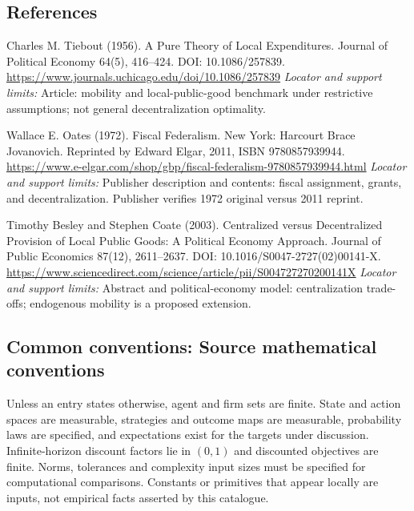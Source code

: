 \documentclass[11pt,a4paper]{article}
\begin{document}
\subsection*{References}
\begin{enumerate}[label={[S\arabic*]},leftmargin=*,itemsep=0.6em]
\item Charles M. Tiebout (1956). A Pure Theory of Local Expenditures. Journal of Political Economy 64(5), 416--424. DOI: 10.1086/257839.
\url{https://www.journals.uchicago.edu/doi/10.1086/257839}
\newline\emph{Locator and support limits:} Article: mobility and local-public-good benchmark under restrictive assumptions; not general decentralization optimality.
\item Wallace E. Oates (1972). Fiscal Federalism. New York: Harcourt Brace Jovanovich. Reprinted by Edward Elgar, 2011, ISBN 9780857939944.
\url{https://www.e-elgar.com/shop/gbp/fiscal-federalism-9780857939944.html}
\newline\emph{Locator and support limits:} Publisher description and contents: fiscal assignment, grants, and decentralization. Publisher verifies 1972 original versus 2011 reprint.
\item Timothy Besley and Stephen Coate (2003). Centralized versus Decentralized Provision of Local Public Goods: A Political Economy Approach. Journal of Public Economics 87(12), 2611--2637. DOI: 10.1016/S0047-2727(02)00141-X.
\url{https://www.sciencedirect.com/science/article/pii/S004727270200141X}
\newline\emph{Locator and support limits:} Abstract and political-economy model: centralization trade-offs; endogenous mobility is a proposed extension.
\end{enumerate}

\subsection*{Common conventions: Source mathematical conventions}

Unless an entry states otherwise, agent and firm sets are finite. State and action spaces are measurable, strategies and outcome maps are measurable, probability laws are specified, and expectations exist for the targets under discussion. Infinite-horizon discount factors lie in $(0,1)$ and discounted objectives are finite. Norms, tolerances and complexity input sizes must be specified for computational comparisons. Constants or primitives that appear locally are inputs, not empirical facts asserted by this catalogue.
\end{document}
